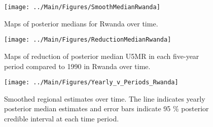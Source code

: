 \documentclass[12pt]{article}\usepackage[]{graphicx}\usepackage[]{color}
\newenvironment{knitrout}{}{} %
\begin{document}
\begin{knitrout}
\color{fgcolor}\begin{figure}[bht]

{\centering \texttt{[image: ../Main/Figures/SmoothMedianRwanda]} 

}

\caption[Maps of posterior medians for Rwanda  over time]{Maps of posterior medians for Rwanda  over time.}\label{fig:unnamed-chunk-274}
\end{figure}


\end{knitrout}
\begin{knitrout}
\color{fgcolor}\begin{figure}[bht]

{\centering \texttt{[image: ../Main/Figures/ReductionMedianRwanda]} 

}

\caption[Maps of reduction of posterior median U5MR in each five-year period compared to 1990 in Rwanda over time]{Maps of reduction of posterior median U5MR in each five-year period compared to 1990 in Rwanda over time.}\label{fig:unnamed-chunk-275}
\end{figure}


\end{knitrout}
\begin{knitrout}
\color{fgcolor}\begin{figure}[bht]

{\centering \texttt{[image: ../Main/Figures/Yearly\_v\_Periods\_Rwanda]} 

}

\caption[Smoothed regional estimates over time]{Smoothed regional estimates over time. The line indicates yearly posterior median estimates and error bars indicate 95 \% posterior credible interval at each time period.}\label{fig:unnamed-chunk-276}
\end{figure}


\end{knitrout}
\end{document}
